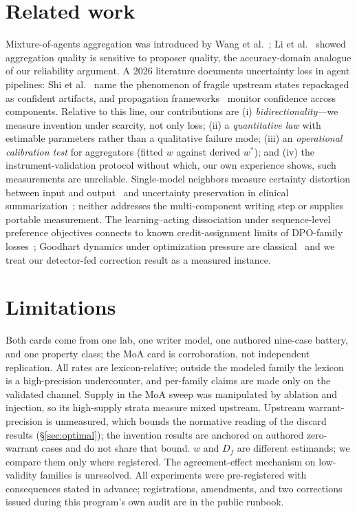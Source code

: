 \documentclass[11pt]{article}
\newcommand{\ww}{\ensuremath{w}}
\begin{document}
\section{Related work}
\label{sec:related}

Mixture-of-agents aggregation was introduced by Wang et
al.~\cite{wang2024moa}; Li et al.~\cite{li2025selfmoa} showed aggregation
quality is sensitive to proposer quality, the accuracy-domain analogue of
our reliability argument. A 2026 literature documents uncertainty loss in
agent pipelines: Shi et al.~\cite{shi2026laundering} name the phenomenon of
fragile upstream states repackaged as confident artifacts, and propagation
frameworks~\cite{up2026,runtime2026,confsignals2026} monitor confidence
across components. Relative to this line, our contributions are (i)
\emph{bidirectionality}---we measure invention under scarcity, not only
loss; (ii) a \emph{quantitative law} with estimable parameters rather than
a qualitative failure mode; (iii) an \emph{operational calibration test}
for aggregators (fitted \ww{} against derived $\ww^{*}$); and (iv) the
instrument-validation protocol without which, our own experience shows,
such measurements are unreliable. Single-model neighbors measure certainty
distortion between input and output~\cite{cd2026} and uncertainty
preservation in clinical summarization~\cite{clinical2026}; neither
addresses the multi-component writing step or supplies portable
measurement. The learning--acting dissociation under sequence-level
preference objectives connects to known credit-assignment limits of
DPO-family losses~\cite{rafailov2023dpo,hong2024orpo}; Goodhart dynamics
under optimization pressure are classical~\cite{goodhart1984,campbell1979}
and we treat our detector-fed correction result as a measured instance.

\section{Limitations}
\label{sec:limits}

Both cards come from one lab, one writer model, one authored nine-case
battery, and one property class; the MoA card is corroboration, not
independent replication. All rates are lexicon-relative; outside the
modeled family the lexicon is a high-precision undercounter, and per-family
claims are made only on the validated channel. Supply in the MoA sweep was
manipulated by ablation and injection, so its high-supply strata measure
mixed upstream. Upstream warrant-precision is unmeasured, which bounds the
normative reading of the discard results (\S\ref{sec:optimal}); the
invention results are anchored on authored zero-warrant cases and do not
share that bound. $\ww$ and $D_f$ are different estimands; we compare them
only where registered. The agreement-effect mechanism on low-validity
families is unresolved. All experiments were pre-registered with
consequences stated in advance; registrations, amendments, and two
corrections issued during this program's own audit are in the public
runbook.
\end{document}
